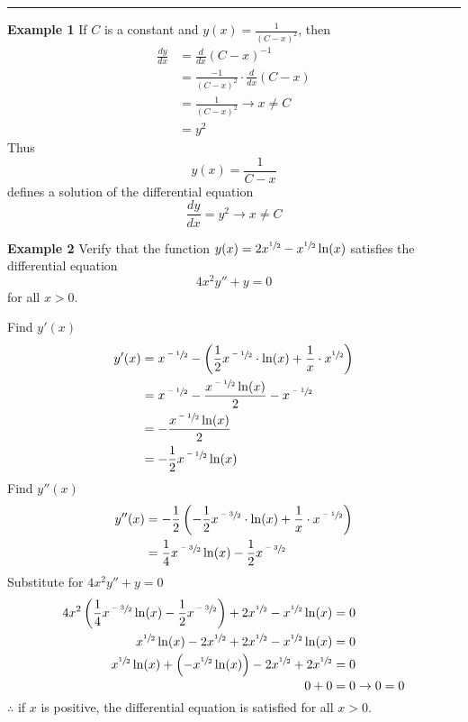 \documentclass{article}
\begin{document}
\par\noindent\rule{\textwidth}{0.4pt}

\textbf{Example 1}
If $ C $ is a constant and $ y(x) = \frac{1}{(C-x)^2} $, then
\begin{align*}
    \frac{dy}{dx} & = \frac{d}{dx} \left(C-x\right)^{-1} \\
                  & = \frac{-1}{\left(C-x\right)^2} \cdot \frac{d}{dx}\left(C-x\right) \\
                  & = \frac{1}{\left(C-x\right)^2} \rightarrow x \neq C \\
                  & = y^2
\end{align*}
Thus
$$ y(x) = \frac{1}{C-x} $$
defines a solution of the differential equation
$$ \frac{dy}{dx} = y^2 \rightarrow x \neq C $$

\textbf{Example 2}
Verify that the function $ y(x) = 2x^{\sfrac{1}{2}} - x^{\sfrac{1}{2}}\ln(x) $ satisfies the differential equation
$$ 4x^2y'' + y = 0 $$
for all $ x > 0 $.

Find $ y'(x) $
\begin{align*}
    y'(x) & = x^{\sfrac{-1}{2}} - \left( \frac{1}{2}x^{\sfrac{-1}{2}} \cdot \ln(x) + \frac{1}{x} \cdot x^{\sfrac{1}{2}} \right) \\
          & = x^{\sfrac{-1}{2}} - \frac{x^{\sfrac{-1}{2}}\ln(x)}{2} - x^{\sfrac{-1}{2}} \\
          & = -\frac{x^{\sfrac{-1}{2}}\ln(x)}{2} \\
          & = -\frac{1}{2}x^{\sfrac{-1}{2}}\ln(x)
\end{align*}
Find $ y''(x) $
\begin{align*}
    y''(x) & = -\frac{1}{2} \left( -\frac{1}{2}x^{\sfrac{-3}{2}} \cdot \ln(x) + \frac{1}{x} \cdot x^{\sfrac{-1}{2}} \right) \\
           & = \frac{1}{4}x^{\sfrac{-3}{2}}\ln(x) - \frac{1}{2}x^{\sfrac{-3}{2}}
\end{align*}
Substitute for $ 4x^2y'' + y = 0 $
\begin{align*}
    4x^2 \left( \frac{1}{4}x^{\sfrac{-3}{2}}\ln(x) - \frac{1}{2}x^{\sfrac{-3}{2}} \right) + 2x^{\sfrac{1}{2}} - x^{\sfrac{1}{2}}\ln(x) & = 0 \\
    x^{\sfrac{1}{2}}\ln(x) - 2x^{\sfrac{1}{2}} + 2x^{\sfrac{1}{2}} - x^{\sfrac{1}{2}}\ln(x) & = 0 \\
    x^{\sfrac{1}{2}}\ln(x) + \left( -x^{\sfrac{1}{2}}\ln(x) \right) - 2x^{\sfrac{1}{2}} + 2x^{\sfrac{1}{2}} & = 0 \\
    0 + 0 & = 0 \rightarrow 0 = 0
\end{align*}
$ \therefore $ if $ x $ is positive, the differential equation is satisfied for all $ x > 0 $.
\end{document}
